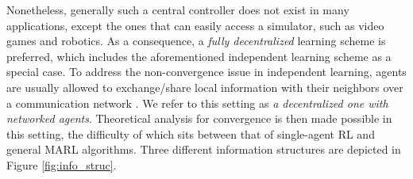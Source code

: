Nonetheless, generally such a central controller does not exist in many applications, except the ones that can easily access a  simulator, such as  video games and robotics. As a consequence, a  \emph{fully decentralized} learning scheme is preferred, which includes the aforementioned independent learning scheme as a special case. To address the non-convergence issue in  independent learning, agents are usually allowed to exchange/share local information with their neighbors over a  communication network  \cite{kar2013cal,macua2015distributed,macua2017diff,zhang2018fully,zhang18cdc,zhang2018finite,lee2018primal,wai2018multi,doan2019finitea,doan2019finiteb,suttle2019multi,lin2019communication}. We refer to this setting as \emph{a decentralized one  with networked agents}. 
Theoretical analysis for convergence is then made possible in this setting, the difficulty of which sits between that of single-agent RL and general MARL algorithms. 
Three different information structures are depicted  in Figure \ref{fig:info_struc}.  



%
%
%
%

